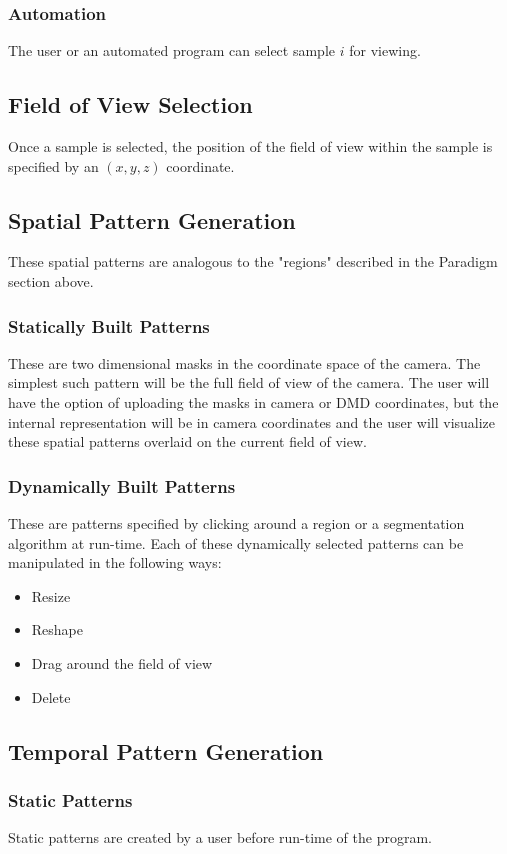 \documentclass[a4paper,12pt]{article}
\begin{document}
\subsubsection{Automation}
The user or an automated program can select sample $i$ for viewing.
\subsection{Field of View Selection}
Once a sample is selected, the position of the field of view within the sample
is specified by an $(x,y,z)$ coordinate.
\subsection{Spatial Pattern Generation}
These spatial patterns are analogous to the "regions" described in the Paradigm
section above.
\subsubsection{Statically Built Patterns}
These are two dimensional masks in the coordinate space of the camera. The 
simplest such pattern will be the full field of view of the camera. The user
will have the option of uploading the masks in camera or DMD coordinates, but 
the internal representation will be in camera coordinates and the user will
visualize these spatial patterns overlaid on the current field of view.
\subsubsection{Dynamically Built Patterns}
These are patterns specified by clicking around a region or a segmentation 
algorithm at run-time. Each of these dynamically selected patterns can be 
manipulated in the following ways:
\begin{itemize}
  \item Resize
  \item Reshape
  \item Drag around the field of view
  \item Delete
\end{itemize}
\subsection{Temporal Pattern Generation}
\subsubsection{Static Patterns}
Static patterns are created by a user before run-time of the program.
\end{document}
